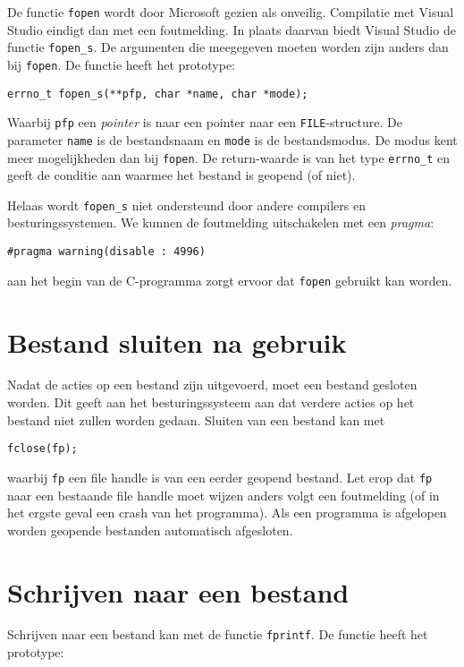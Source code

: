 \begin{infobox}
De functie \texttt{fopen} wordt door Microsoft gezien als onveilig. Compilatie met Visual Studio eindigt dan met een foutmelding. In plaats daarvan biedt Visual Studio de functie \texttt{fopen\_s}. De argumenten die meegegeven moeten worden zijn anders dan bij \texttt{fopen}. De functie heeft het prototype:

\hspace*{1em}\texttt{errno\_t fopen\_s(**pfp, char *name, char *mode);}

Waarbij \texttt{pfp} een \textsl{pointer} is naar een pointer naar een \texttt{FILE}-structure. De parameter \texttt{name} is de bestandsnaam en \texttt{mode} is de bestandsmodus. De modus kent meer mogelijkheden dan bij \texttt{fopen}. De return-waarde is van het type \texttt{errno\_t} en geeft de conditie aan waarmee het bestand is geopend (of niet).

Helaas wordt \texttt{fopen\_s} niet ondersteund door andere compilers en besturingssystemen. We kunnen de foutmelding uitschakelen met een \textsl{pragma}:

\hspace*{1em}\texttt{\#pragma warning(disable : 4996)}

aan het begin van de C-programma zorgt ervoor dat \texttt{fopen} gebruikt kan worden.
\end{infobox}


\section{Bestand sluiten na gebruik}
Nadat de acties op een bestand zijn uitgevoerd, moet een bestand gesloten worden. Dit geeft aan het besturingssysteem aan dat verdere acties op het bestand niet zullen worden gedaan. Sluiten van een bestand kan met

\hspace*{1em}\texttt{fclose(fp);}

waarbij \texttt{fp} een file handle is van een eerder geopend bestand. Let erop dat \texttt{fp} naar een bestaande file handle moet wijzen anders volgt een foutmelding (of in het ergste geval een crash van het programma). Als een programma is afgelopen worden geopende bestanden automatisch afgesloten.


\section{Schrijven naar een bestand}
Schrijven naar een bestand kan met de functie \texttt{fprintf}. De functie heeft het prototype:

